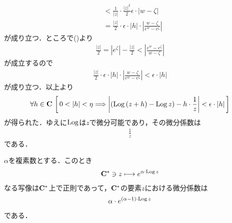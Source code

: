 \begin{sketch}
\begin{description}
\begin{align}
					&< \frac{1}{|z|} \cdot \frac{|z|^2}{2} \epsilon \cdot |w - \zeta| \\
					&= \frac{|z|}{2} \cdot \epsilon \cdot |h| \cdot \left|\frac{w-\zeta}{e^{w} - e^{\zeta}}\right|
				\end{align}
				が成り立つ．ところで()より
				\begin{align}
					\frac{|z|}{2} = |e^{\zeta}| - \frac{|z|}{2} 
					< \left|\frac{e^{w} - e^{\zeta}}{w- \zeta}\right|
				\end{align}
				が成立するので
				\begin{align}
					\frac{|z|}{2} \cdot \epsilon \cdot |h| \cdot \left|\frac{w-\zeta}{e^{w} - e^{\zeta}}\right|
					< \epsilon \cdot |h|
				\end{align}
				が成り立つ．以上より
				\begin{align}
					\forall h \in \mathbf{C}\,
					\left[\, 0 < |h| < \eta \Longrightarrow \left|(\operatorname{Log}{(z+h)} - \operatorname{Log}{z}) - h \cdot \frac{1}{z}\right| < \epsilon \cdot |h|\, \right]
				\end{align}
				が得られた．ゆえに$\operatorname{Log}$は$z$で微分可能であり，その微分係数は
				\begin{align}
					\frac{1}{z}
				\end{align}
				である．
				\QED
		\end{description}
	\end{sketch}
	
	\begin{screen}
		\begin{thm}
			$\alpha$を複素数とする．このとき
			\begin{align}
				\mathbf{C}^* \ni z \longmapsto e^{\alpha \cdot \operatorname{Log}{z}}
			\end{align}
			なる写像は$\mathbf{C}^*$上で正則であって，$\mathbf{C}^*$の要素$z$における微分係数は
			\begin{align}
				\alpha \cdot e^{(\alpha-1) \cdot \operatorname{Log}{z}}
			\end{align}
			である．
		\end{thm}
	\end{screen}